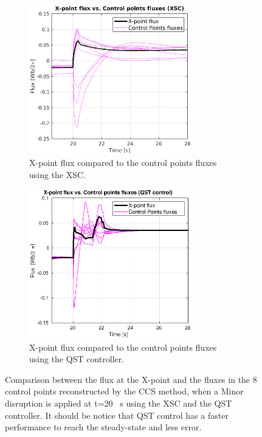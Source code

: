 \begin{figure}[h]
	\centering
	\begin{subfigure}[b]{0.4\textwidth}
		\includegraphics[height=6.5cm] {Chp3/Results_iso/8_gaps_XpointVSpoinsFlux_mnr_dsrp.eps}  
		\caption{ X-point flux compared to the control points fluxes using the XSC.
			\label{XpointVScntrlpointsXSC} }
	\end{subfigure}
	\hspace{2 cm}
	\begin{subfigure}[b]{0.4\textwidth}
		\includegraphics[height=6.5cm] {Chp3/Results_iso/8_gaps_Xpoint_flux_comparFBC.eps}  
		\caption{ X-point flux compared to the control points fluxes using the QST controller.
			\label{XpointVScntrlpointsFBC} }
	\end{subfigure}
\caption{Comparison between the flux at the X-point and the fluxes in the 8 control points reconstructed by the CCS method, when a Minor disruption is applied at t=20 ~s using the XSC and the QST controller. It should be notice that QST control has a faster performance to reach the steady-state and less error. } \label{XpointFluxes}
\end{figure}



